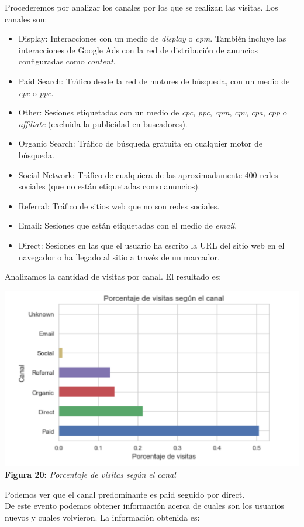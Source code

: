 \documentclass[titlepage,a4paper]{article}
\begin{document}
	Procederemos por analizar los canales por los que se realizan las visitas. Los canales son: 
	\begin{itemize}
	\item Display: Interacciones con un medio de \textit{display} o \textit{cpm}. También incluye las interacciones de Google Ads con la red de distribución de anuncios configuradas como \textit{content}.
	\item Paid Search: Tráfico desde la red de motores de búsqueda, con un medio de \textit{cpc} o \textit{ppc}.
	\item Other: Sesiones etiquetadas con un medio de \textit{cpc}, \textit{ppc}, \textit{cpm}, \textit{cpv}, \textit{cpa}, \textit{cpp} o \textit{affiliate} (excluida la publicidad en buscadores).
	\item Organic Search: Tráfico de búsqueda gratuita en cualquier motor de búsqueda.
	\item Social Network: Tráfico de cualquiera de las aproximadamente 400 redes sociales (que no están etiquetadas como anuncios).
	\item Referral: Tráfico de sitios web que no son redes sociales.
	\item Email: Sesiones que están etiquetadas con el medio de \textit{email}.
	\item Direct: Sesiones en las que el usuario ha escrito la URL del sitio web en el navegador o ha llegado al sitio a través de un marcador.
	\end{itemize}
	Analizamos la cantidad de visitas por canal. El resultado es:
	\begin{center}
	\includegraphics[width=15cm] {porcentajeDeVisitasPorCanal.jpg}\\
	\textbf{Figura 20:}  \textit{Porcentaje de visitas según el  canal}
	\end{center}
	Podemos ver que el canal predominante es paid seguido por direct. \\
	De este evento podemos obtener información acerca de cuales son los usuarios nuevos y cuales volvieron. La información obtenida es:
	
\end{document}
